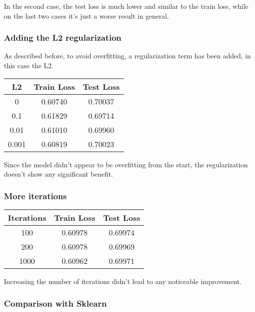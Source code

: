 \documentclass[
	letterpaper, %
	10pt, %
]{class}
\begin{document}
In the second case, the test loss is much lower and similar to the train loss, while on the last two cases it's just a worse result in general.

\subsubsection{Adding the L2 regularization}

As described before, to avoid overfitting, a regularization term has been added, in this case the L2.

\begin{center}
	\begin{tabular}{ |c|c|c| }
		\hline
		L2    & Train Loss & Test Loss \\
		\hline
		0     & 0.60740    & 0.70037   \\
		0.1   & 0.61829    & 0.69714   \\
		0.01  & 0.61010    & 0.69960   \\
		0.001 & 0.60819    & 0.70023   \\
		\hline
	\end{tabular}
\end{center}

Since the model didn't appear to be overfitting from the start, the regularization doesn't show any significant benefit.

\subsubsection{More iterations}

\begin{center}
	\begin{tabular}{ |c|c|c| }
		\hline
		Iterations & Train Loss & Test Loss \\
		\hline
		100        & 0.60978    & 0.69974   \\
		200        & 0.60978    & 0.69969   \\
		1000       & 0.60962    & 0.69971   \\
		\hline
	\end{tabular}
\end{center}

Increasing the number of iterations didn't lead to any noticeable improvement.

\subsubsection{Comparison with Sklearn}
\end{document}
